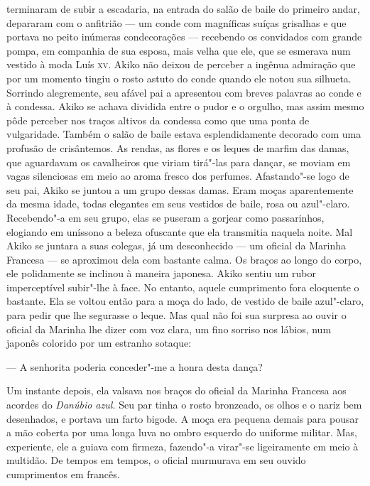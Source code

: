 terminaram de subir a escadaria, na entrada do salão de baile do
primeiro andar, depararam com o anfitrião --- um conde com magníficas
suíças grisalhas e que portava no peito inúmeras condecorações --- 
recebendo os convidados com grande pompa, em companhia de sua esposa,
mais velha que ele, que se esmerava num vestido à moda Luís \textsc{xv}. Akiko
não deixou de perceber a ingênua admiração que por um momento tingiu o
rosto astuto do conde quando ele notou sua silhueta. Sorrindo
alegremente, seu afável pai a apresentou com breves palavras ao conde e
à condessa. Akiko se achava dividida entre o pudor e o orgulho, mas
assim mesmo pôde perceber nos traços altivos da condessa como que uma
ponta de vulgaridade. Também o salão de baile estava esplendidamente
decorado com uma profusão de crisântemos. As rendas, as flores e os
leques de marfim das damas, que aguardavam os cavalheiros que viriam
tirá"-las para dançar, se moviam em vagas silenciosas em meio ao aroma
fresco dos perfumes. Afastando"-se logo de seu pai, Akiko se juntou a um
grupo dessas damas. Eram moças aparentemente da mesma idade, todas
elegantes em seus vestidos de baile, rosa ou azul"-claro. Recebendo"-a em
seu grupo, elas se puseram a gorjear como passarinhos, elogiando em
uníssono a beleza ofuscante que ela transmitia naquela noite. Mal Akiko
se juntara a suas colegas, já um desconhecido --- um oficial da Marinha
Francesa --- se aproximou dela com bastante calma. Os braços ao longo do
corpo, ele polidamente se inclinou à maneira japonesa. Akiko sentiu um
rubor imperceptível subir"-lhe à face. No entanto, aquele cumprimento
fora eloquente o bastante. Ela se voltou então para a moça do lado, de
vestido de baile azul"-claro, para pedir que lhe segurasse o leque. Mas
qual não foi sua surpresa ao ouvir o oficial da Marinha lhe dizer com
voz clara, um fino sorriso nos lábios, num japonês colorido por um
estranho sotaque:

--- A senhorita poderia conceder"-me a honra desta dança?

Um instante depois, ela valsava nos braços do oficial da Marinha
Francesa aos acordes do \textit{Danúbio azul. }Seu par tinha o rosto
bronzeado, os olhos e o nariz bem desenhados, e portava um farto
bigode. A moça era pequena demais para pousar a mão coberta por uma
longa luva no ombro esquerdo do uniforme militar. Mas, experiente, ele
a guiava com firmeza, fazendo"-a virar"-se ligeiramente em meio à
multidão. De tempos em tempos, o oficial murmurava em seu ouvido
cumprimentos em francês.

